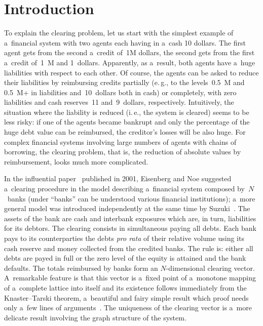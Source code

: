       \begin{multicols}{2}

                  \label{st\stat}


\section{Introduction}

\noindent
To explain the clearing problem, let us start with the simplest example of 
a~financial
system with two agents each having in a~cash 10 dollars. The first agent gets 
from the second a~credit of~1M  dollars, the second gets from the first  a~credit 
of~1~M and 1~dollars. Apparently, as a~result, both agents have a~huge liabilities with 
respect to each other. Of course, the agents can be asked to reduce their 
liabilities by reimbursing credits partially (e.\,g., to the levels~0.5~M and 
0.5~M\;+ in liabilities and~10~dollars both in cash) or completely, with zero 
liabilities and cash reserves~11 and~9~dollars, respectively. Intuitively, the 
situation where the liability is reduced (i.\,e., the system is cleared) seems to 
be less risky: if one of the agents became bankrupt and only the percentage of the 
huge debt value  can be reimbursed, the creditor's losses will be also huge. For 
complex financial systems involving large numbers of agents
with chains of borrowing,  the clearing problem, that is, the reduction of 
absolute values by reimbursement, looks much more complicated.
{ %

}

In the influential paper~\cite{Eisenberg-Noe} published in 2001, Eisenberg and 
Noe suggested a~clearing procedure in the model describing a~financial system 
composed by~$N$~banks (under ``banks''  can be understood  various financial 
institutions); a~more general model was introduced independently at the same 
time by Suzuki~\cite{Suzuki}.   The assets of the bank are cash and interbank 
exposures which are, in turn, liabilities for its debtors.  The clearing 
consists in simultaneous paying all debts. Each bank pays to its counterparties 
the debts \textit{pro rata} of their relative volume using its cash reserve and 
money collected from the credited banks. The rule is: either all debts are payed 
in full or the zero level of the equity is attained and the bank defaults. The 
totals reimbursed by banks form an $N$-dimensional clearing vector. A~remarkable 
feature is that this vector is a~fixed point of a~monotone mapping of a~complete 
lattice into itself and its existence follows immediately from the 
Knaster--Tarski  theorem, a~beautiful and fairy simple result which proof needs only 
a~few lines of arguments~\cite{Tarski}. The uniqueness of the clearing vector is a~more 
delicate 
result involving the graph structure of the system.


\end{multicols}
